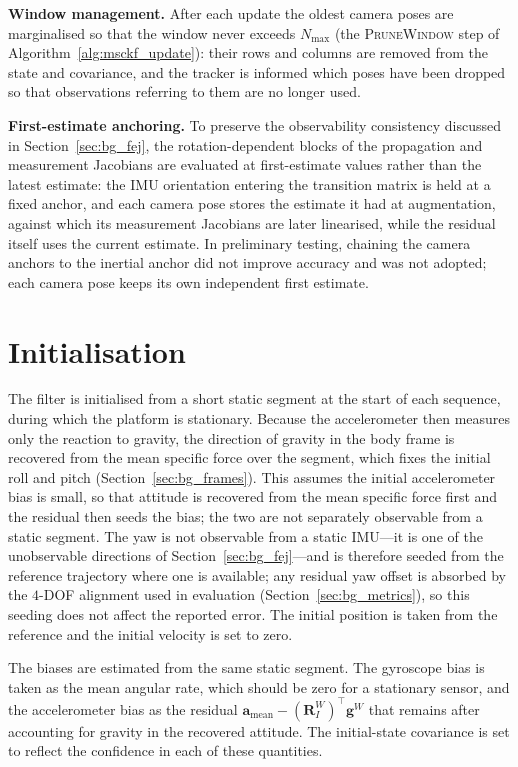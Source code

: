 \textbf{Window management.} After each update the oldest camera poses are marginalised so that the window never exceeds $N_{\max}$ (the \textsc{PruneWindow} step of Algorithm~\ref{alg:msckf_update}): their rows and columns are removed from the state and covariance, and the tracker is informed which poses have been dropped so that observations referring to them are no longer used.

\textbf{First-estimate anchoring.} To preserve the observability consistency discussed in Section~\ref{sec:bg_fej}, the rotation-dependent blocks of the propagation and measurement Jacobians are evaluated at first-estimate values rather than the latest estimate: the IMU orientation entering the transition matrix is held at a fixed anchor, and each camera pose stores the estimate it had at augmentation, against which its measurement Jacobians are later linearised, while the residual itself uses the current estimate. In preliminary testing, chaining the camera anchors to the inertial anchor did not improve accuracy and was not adopted; each camera pose keeps its own independent first estimate.

\section{Initialisation}
\label{sec:m_init}
The filter is initialised from a short static segment at the start of each sequence, during which the platform is stationary. Because the accelerometer then measures only the reaction to gravity, the direction of gravity in the body frame is recovered from the mean specific force over the segment, which fixes the initial roll and pitch (Section~\ref{sec:bg_frames}). This assumes the initial accelerometer bias is small, so that attitude is recovered from the mean specific force first and the residual then seeds the bias; the two are not separately observable from a static segment. The yaw is not observable from a static IMU---it is one of the unobservable directions of Section~\ref{sec:bg_fej}---and is therefore seeded from the reference trajectory where one is available; any residual yaw offset is absorbed by the $4$-DOF alignment used in evaluation (Section~\ref{sec:bg_metrics}), so this seeding does not affect the reported error. The initial position is taken from the reference and the initial velocity is set to zero.

The biases are estimated from the same static segment. The gyroscope bias is taken as the mean angular rate, which should be zero for a stationary sensor, and the accelerometer bias as the residual $\mathbf{a}_{\text{mean}} - (\mathbf{R}_{I}^{W})^{\top}\mathbf{g}^{W}$ that remains after accounting for gravity in the recovered attitude. The initial-state covariance is set to reflect the confidence in each of these quantities.

